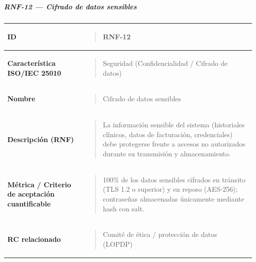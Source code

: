 \documentclass[
]{article}
\newcounter{none} %
\begin{document}
\subparagraph{RNF-12 --- Cifrado de datos
sensibles}\label{rnf-12-cifrado-de-datos-sensibles}

{\def\LTcaptype{none} %
\begin{longtable}[]{@{}
  >{\raggedright\arraybackslash}p{}
  >{\raggedright\arraybackslash}p{}@{}}
\toprule\noalign{}
\begin{minipage}[b]{\linewidth}\raggedright
\textbf{ID}
\end{minipage} & \begin{minipage}[b]{\linewidth}\raggedright
\begin{quote}
RNF-12
\end{quote}
\end{minipage} \\
\midrule\noalign{}
\endhead
\bottomrule\noalign{}
\endlastfoot
\textbf{Característica ISO/IEC 25010} & \begin{minipage}[t]{\linewidth}\raggedright
\begin{quote}
Seguridad (Confidencialidad / Cifrado de datos)
\end{quote}
\end{minipage} \\
\textbf{Nombre} & \begin{minipage}[t]{\linewidth}\raggedright
\begin{quote}
Cifrado de datos sensibles
\end{quote}
\end{minipage} \\
\textbf{Descripción (RNF)} & \begin{minipage}[t]{\linewidth}\raggedright
\begin{quote}
La información sensible del sistema (historiales clínicos, datos de
facturación, credenciales) debe protegerse frente a accesos no
autorizados durante su transmisión y almacenamiento.
\end{quote}
\end{minipage} \\
\textbf{Métrica / Criterio de aceptación cuantificable} & \begin{minipage}[t]{\linewidth}\raggedright
\begin{quote}
100\% de los datos sensibles cifrados en tránsito (TLS 1.2 o superior)
y en reposo (AES-256); contraseñas almacenadas únicamente mediante
hash con salt.
\end{quote}
\end{minipage} \\
\textbf{RC relacionado} & \begin{minipage}[t]{\linewidth}\raggedright
\begin{quote}
Comité de ética / protección de datos (LOPDP)
\end{quote}
\end{minipage} \\
\end{longtable}
}
\end{document}
